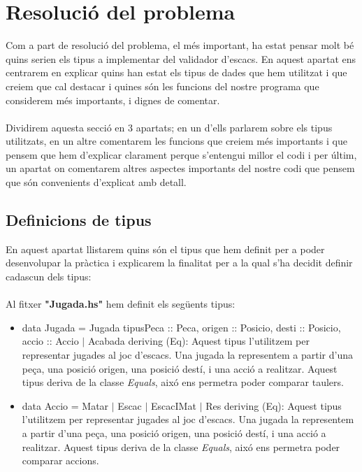 \documentclass[12pt]{article}
\begin{document}
\section{Resolució del problema}

Com a part de resolució del problema, el més important, ha estat pensar molt bé quins serien els tipus a implementar del validador d'escacs. En aquest apartat ens centrarem en explicar quins han estat els tipus de dades que hem utilitzat i que creiem que cal destacar i quines són les funcions del nostre programa que considerem més importants, i dignes de comentar.
\\
\\
Dividirem aquesta secció en 3 apartats; en un d'ells parlarem sobre els tipus utilitzats, en un altre comentarem les funcions que creiem més importants i que pensem que hem d'explicar clarament perque s'entengui millor el codi i per últim, un apartat on comentarem altres aspectes importants del nostre codi que pensem que són convenients d'explicat amb detall.




\subsection{Definicions de tipus}

En aquest apartat llistarem quins són el tipus que hem definit per a poder desenvolupar la pràctica i explicarem la finalitat per a la qual s'ha decidit definir cadascun dels tipus:
\noindent
\\
\\
Al fitxer \textbf{"Jugada.hs"} hem definit els següents tipus:
\begin{itemize}
\item \textsf{data Jugada = Jugada {tipusPeca :: Peca, origen :: Posicio, desti :: Posicio, accio :: Accio} $|$ Acabada deriving (Eq)}: Aquest tipus l'utilitzem per representar jugades al joc d'escacs. Una jugada la representem a partir d'una peça, una posició origen, una posició destí, i una acció a realitzar. Aquest tipus deriva de la classe \textit{Equals}, aixó ens permetra poder comparar taulers.
\end{itemize}

\begin{itemize}
\item \textsf{data Accio = Matar $|$ Escac $|$ EscacIMat $|$ Res deriving (Eq)}: Aquest tipus l'utilitzem per representar jugades al joc d'escacs. Una jugada la representem a partir d'una peça, una posició origen, una posició destí, i una acció a realitzar. Aquest tipus deriva de la classe \textit{Equals}, aixó ens permetra poder comparar accions.
\end{itemize}
\end{document}
